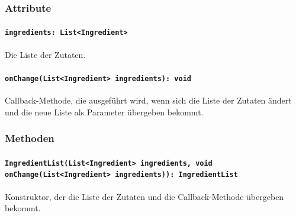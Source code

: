 \documentclass{entwurfsheft}
\begin{document}
\begin{sloppypar}
\subsubsection*{Attribute}
\paragraph{\texttt{ingredients: List<Ingredient>}}
Die Liste der Zutaten.
\paragraph{\texttt{onChange(List<Ingredient> ingredients): void}}
Callback-Methode, die ausgeführt wird, wenn sich die Liste der Zutaten ändert und die neue Liste als Parameter übergeben bekommt.
\subsubsection*{Methoden}
\paragraph{\texttt{IngredientList(List<Ingredient> ingredients, void onChange(List<Ingredient> ingredients)): IngredientList}}
Konstruktor, der die Liste der Zutaten und die Callback-Methode übergeben bekommt.
\newpage

\end{sloppypar}
\end{document}
